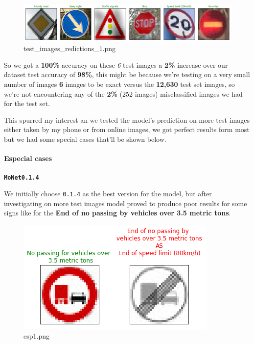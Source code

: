 \documentclass[11pt]{article}
\makeatletter
\def\maxwidth{\ifdim\Gin@nat@width>\linewidth\linewidth
    \else\Gin@nat@width\fi}
\let\Oldincludegraphics\includegraphics
\renewcommand{\includegraphics}[1]{\Oldincludegraphics[width=.8\maxwidth]{#1}}
\makeatother
\begin{document}
\begin{figure}
\centering
\includegraphics{./assets/test_images_redictions_1.png}
\caption{test\_images\_redictions\_1.png}
\end{figure}

So we got a \textbf{100\%} accuracy on these \emph{6} test images a
\textbf{2\%} increase over our dataset test accuracy of \textbf{98\%},
this might be because we're testing on a very small number of images
\textbf{6} images to be exact versus the \textbf{12,630} test set
images, so we're not encountering any of the \textbf{2\%} (252 images)
misclassified images we had for the test set.

This spurred my interest an we tested the model's prediction on more
test images either taken by my phone or from online images, we got
perfect results form most but we had some special cases that'll be shown
below.

    \hypertarget{especial-cases}{%
\paragraph{Especial cases}\label{especial-cases}}

\textbf{\texttt{MoNet0.1.4}}

We initially choose \texttt{0.1.4} as the best version for the model,
but after investigating on more test images model proved to produce poor
results for some signs like for the \textbf{End of no passing by
vehicles over 3.5 metric tons}.

\begin{figure}
\centering
\includegraphics{./assets/esp1.png}
\caption{esp1.png}
\end{figure}
\end{document}
